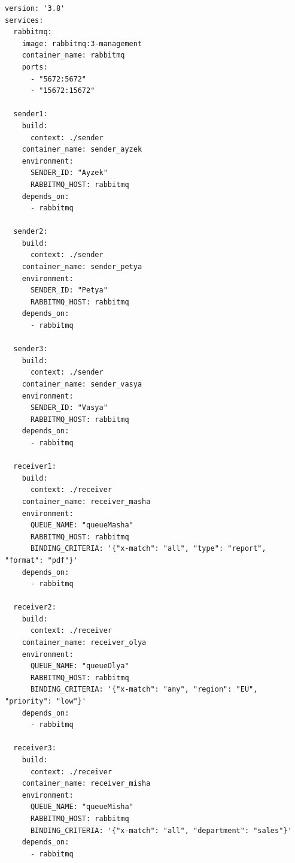 \documentclass[areasetadvanced]{scrartcl}
\begin{document}
\begin{lstlisting}
version: '3.8'
services:
  rabbitmq:
    image: rabbitmq:3-management
    container_name: rabbitmq
    ports:
      - "5672:5672"
      - "15672:15672"

  sender1:
    build:
      context: ./sender      
    container_name: sender_ayzek
    environment:
      SENDER_ID: "Ayzek"
      RABBITMQ_HOST: rabbitmq
    depends_on:
      - rabbitmq

  sender2:
    build:
      context: ./sender      
    container_name: sender_petya
    environment:
      SENDER_ID: "Petya"
      RABBITMQ_HOST: rabbitmq
    depends_on:
      - rabbitmq

  sender3:
    build:
      context: ./sender
    container_name: sender_vasya
    environment:
      SENDER_ID: "Vasya"
      RABBITMQ_HOST: rabbitmq
    depends_on:
      - rabbitmq

  receiver1:
    build:
      context: ./receiver    
    container_name: receiver_masha
    environment:
      QUEUE_NAME: "queueMasha"
      RABBITMQ_HOST: rabbitmq
      BINDING_CRITERIA: '{"x-match": "all", "type": "report", "format": "pdf"}'
    depends_on:
      - rabbitmq

  receiver2:
    build:
      context: ./receiver
    container_name: receiver_olya
    environment:
      QUEUE_NAME: "queueOlya"
      RABBITMQ_HOST: rabbitmq
      BINDING_CRITERIA: '{"x-match": "any", "region": "EU", "priority": "low"}'
    depends_on:
      - rabbitmq

  receiver3:
    build:
      context: ./receiver
    container_name: receiver_misha
    environment:
      QUEUE_NAME: "queueMisha"
      RABBITMQ_HOST: rabbitmq
      BINDING_CRITERIA: '{"x-match": "all", "department": "sales"}'
    depends_on:
      - rabbitmq

\end{lstlisting}

\newpage
\end{document}
